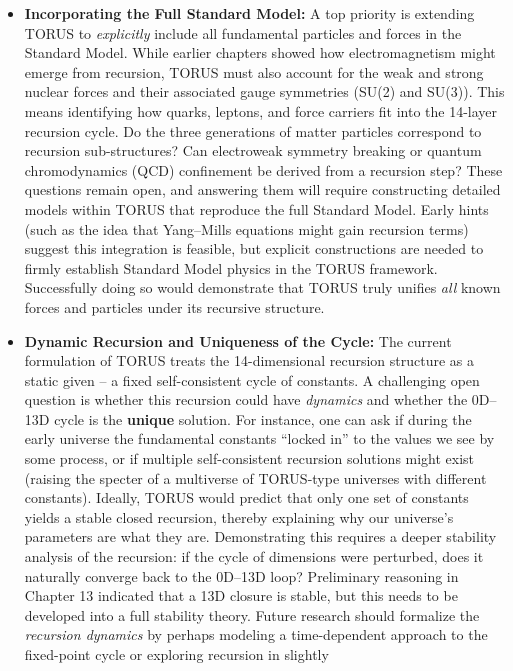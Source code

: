 \begin{itemize}
\item
  \textbf{Incorporating the Full Standard Model:} A top priority is
  extending TORUS to \emph{explicitly} include all fundamental particles
  and forces in the Standard Model. While earlier chapters showed how
  electromagnetism might emerge from recursion, TORUS must also account
  for the weak and strong nuclear forces and their associated gauge
  symmetries (SU(2) and SU(3))​. This means identifying how quarks,
  leptons, and force carriers fit into the 14-layer recursion cycle. Do
  the three generations of matter particles correspond to recursion
  sub-structures? Can electroweak symmetry breaking or quantum
  chromodynamics (QCD) confinement be derived from a recursion step?
  These questions remain open, and answering them will require
  constructing detailed models within TORUS that reproduce the full
  Standard Model. Early hints (such as the idea that Yang--Mills
  equations might gain recursion terms) suggest this integration is
  feasible, but explicit constructions are needed to firmly establish
  Standard Model physics in the TORUS framework​. Successfully doing so
  would demonstrate that TORUS truly unifies \emph{all} known forces and
  particles under its recursive structure.
\item
  \textbf{Dynamic Recursion and Uniqueness of the Cycle:} The current
  formulation of TORUS treats the 14-dimensional recursion structure as
  a static given -- a fixed self-consistent cycle of constants. A
  challenging open question is whether this recursion could have
  \emph{dynamics} and whether the 0D--13D cycle is the \textbf{unique}
  solution. For instance, one can ask if during the early universe the
  fundamental constants ``locked in'' to the values we see by some
  process, or if multiple self-consistent recursion solutions might
  exist (raising the specter of a multiverse of TORUS-type universes
  with different constants)​. Ideally, TORUS would predict that only one
  set of constants yields a stable closed recursion, thereby explaining
  why our universe's parameters are what they are. Demonstrating this
  requires a deeper stability analysis of the recursion: if the cycle of
  dimensions were perturbed, does it naturally converge back to the
  0D--13D loop? Preliminary reasoning in Chapter 13 indicated that a 13D
  closure is stable, but this needs to be developed into a full
  stability theory​. Future research should formalize the
  \emph{recursion dynamics} by perhaps modeling a time-dependent
  approach to the fixed-point cycle or exploring recursion in slightly

\end{itemize}
